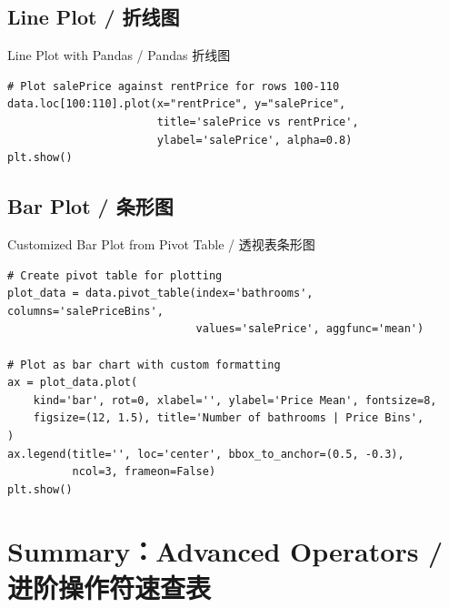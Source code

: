 \documentclass[11pt,a4paper]{article}
\begin{document}
\subsection{Line Plot / 折线图}

\begin{examplebox}{Line Plot with Pandas / Pandas 折线图}
\begin{lstlisting}
# Plot salePrice against rentPrice for rows 100-110
data.loc[100:110].plot(x="rentPrice", y="salePrice",
                       title='salePrice vs rentPrice',
                       ylabel='salePrice', alpha=0.8)
plt.show()
\end{lstlisting}
\end{examplebox}

\subsection{Bar Plot / 条形图}

\begin{examplebox}{Customized Bar Plot from Pivot Table / 透视表条形图}
\begin{lstlisting}
# Create pivot table for plotting
plot_data = data.pivot_table(index='bathrooms', columns='salePriceBins',
                             values='salePrice', aggfunc='mean')

# Plot as bar chart with custom formatting
ax = plot_data.plot(
    kind='bar', rot=0, xlabel='', ylabel='Price Mean', fontsize=8,
    figsize=(12, 1.5), title='Number of bathrooms | Price Bins',
)
ax.legend(title='', loc='center', bbox_to_anchor=(0.5, -0.3),
          ncol=3, frameon=False)
plt.show()
\end{lstlisting}
\end{examplebox}

\section{Summary：Advanced Operators / 进阶操作符速查表}
\end{document}
